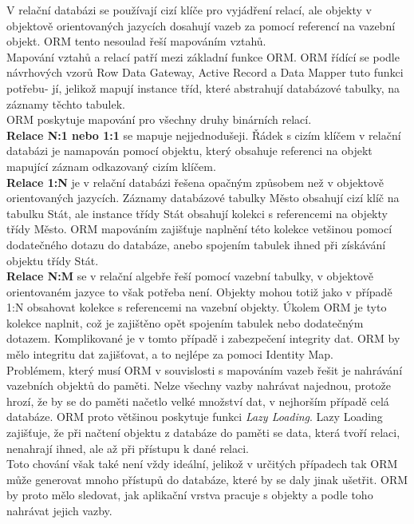 \documentclass[ing,male,java,dept456]{diploma}						%
\begin{document}
V relační databázi se používají cizí klíče pro vyjádření relací, ale objekty v objektově orientovaných jazycích dosahují vazeb za pomocí referencí na vazební objekt. ORM tento nesoulad řeší mapováním vztahů.\\
Mapování vztahů a relací patří mezi základní funkce ORM. ORM řídící se podle návrhových vzorů Row Data Gateway, Active Record a Data Mapper tuto funkci potřebu- jí, jelikož mapují instance tříd, které abstrahují databázové tabulky, na záznamy těchto tabulek. \\
ORM poskytuje mapování pro všechny druhy binárních relací. \\
\textbf{Relace N:1 nebo 1:1} se mapuje nejjednodušeji. Řádek s cizím klíčem v relační databázi je namapován pomocí objektu, který obsahuje referenci na objekt mapující záznam odkazovaný cizím klíčem. \\
\textbf{Relace 1:N} je v relační databázi řešena opačným způsobem než v objektově orientovaných jazycích. Záznamy databázové tabulky Město obsahují cizí klíč na tabulku Stát, ale instance třídy Stát obsahují kolekci s referencemi na objekty třídy Město. ORM mapováním zajišťuje naplnění této kolekce vetšinou pomocí dodatečného dotazu do databáze, anebo spojením tabulek ihned při získávání objektu třídy Stát. \\
\textbf{Relace N:M} se v relační algebře řeší pomocí vazební tabulky, v objektově orientovaném jazyce to však potřeba není. Objekty mohou totiž jako v případě 1:N obsahovat kolekce s referencemi na vazební objekty. Úkolem ORM je tyto kolekce naplnit, což je zajištěno opět spojením tabulek nebo dodatečným dotazem. Komplikované je v tomto případě i zabezpečení integrity dat. ORM by mělo integritu dat zajišťovat, a to nejlépe za pomoci Identity Map. \\
Problémem, který musí ORM v souvislosti s mapováním vazeb řešit je nahrávání vazebních objektů do paměti. Nelze všechny vazby nahrávat najednou, protože hrozí, že by se do paměti načetlo velké množství dat, v nejhorším případě celá databáze. ORM proto většinou poskytuje funkci \textit{Lazy Loading}. Lazy Loading zajišťuje, že při načtení objektu z databáze do paměti se data, která tvoří relaci, nenahrají ihned, ale až při přístupu k dané relaci. \\
Toto chování však také není vždy ideální, jelikož v určitých případech tak ORM může generovat mnoho přístupů do databáze, které by se daly jinak ušetřit. ORM by proto mělo sledovat, jak aplikační vrstva pracuje s objekty a podle toho nahrávat jejich vazby. 
\end{document}
